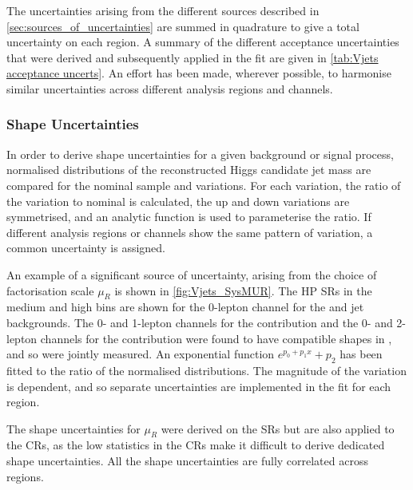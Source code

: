 %
The uncertainties arising from the different sources described in \cref{sec:sources_of_uncertainties} are summed in quadrature to give a total uncertainty on each region.
A summary of the different acceptance uncertainties that were derived and subsequently applied in the fit are given in \cref{tab:Vjets acceptance uncerts}.
An effort has been made, wherever possible, to harmonise similar uncertainties across different analysis regions and channels.



\subsubsection{\Vjets Shape Uncertainties}

In order to derive shape uncertainties for a given background or signal process, normalised distributions of the reconstructed \largeR Higgs candidate jet mass \mJ are compared for the nominal sample and variations.
For each variation, the ratio of the variation to nominal is calculated, the up and down variations are symmetrised, and an analytic function is used to parameterise the ratio.
If different analysis regions or channels show the same pattern of variation, a common uncertainty is assigned.

An example of a significant source of uncertainty, arising from the choice of factorisation scale $\mu_R$ is shown in \cref{fig:Vjets_SysMUR}.
The HP SRs in the medium and high \pTV bins are shown for the 0-lepton channel for the \Whf and \Zhf jet backgrounds.
The 0- and 1-lepton channels for the \Whf contribution and the 0- and 2-lepton channels for the \Zjets contribution were found to have compatible shapes in \mJ, and so were jointly measured.
An exponential function $e^{p_0+p_1x}+p_2$ has been fitted to the ratio of the normalised distributions.
The magnitude of the variation is \ptv dependent, and so separate uncertainties are implemented in the fit for each \pTV region. 

The shape uncertainties for $\mu_R$ were derived on the SRs but are also applied to the CRs, as the low statistics in the CRs make it difficult to derive dedicated shape uncertainties.
All the shape uncertainties are fully correlated across regions.

